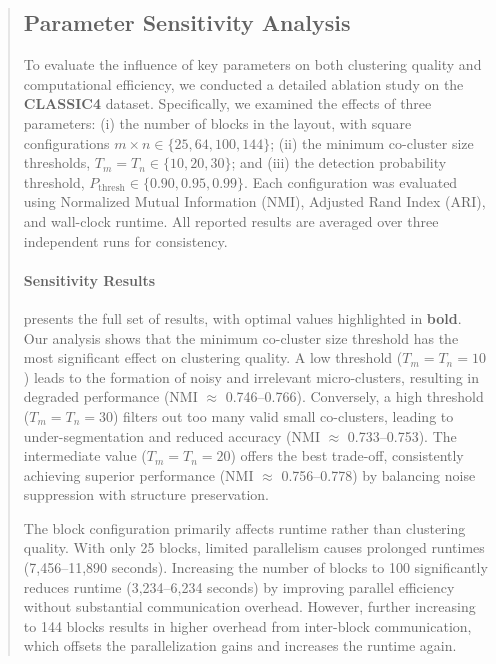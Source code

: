 \documentclass{ar2rc}
\theoremstyle{definition}
\theoremstyle{remark} %
\begin{document}
\begin{quote}
  \subsection*{ Parameter Sensitivity Analysis}

  To evaluate the influence of key parameters on both clustering quality and computational efficiency, we conducted a detailed ablation study on the \textbf{CLASSIC4} dataset. Specifically, we examined the effects of three parameters: (i) the number of blocks in the layout, with square configurations $m \times n \in \{25, 64, 100, 144\}$; (ii) the minimum co-cluster size thresholds, $T_m = T_n \in \{10, 20, 30\}$; and (iii) the detection probability threshold, $P_{\text{thresh}} \in \{0.90, 0.95, 0.99\}$. Each configuration was evaluated using Normalized Mutual Information (NMI), Adjusted Rand Index (ARI), and wall-clock runtime. All reported results are averaged over three independent runs for consistency.

  \paragraph{Sensitivity Results}
   presents the full set of results, with optimal values highlighted in \textbf{bold}. Our analysis shows that the minimum co-cluster size threshold has the most significant effect on clustering quality. A low threshold ($T_m = T_n = 10$) leads to the formation of noisy and irrelevant micro-clusters, resulting in degraded performance (NMI $\approx$ 0.746--0.766). Conversely, a high threshold ($T_m = T_n = 30$) filters out too many valid small co-clusters, leading to under-segmentation and reduced accuracy (NMI $\approx$ 0.733--0.753). The intermediate value ($T_m = T_n = 20$) offers the best trade-off, consistently achieving superior performance (NMI $\approx$ 0.756--0.778) by balancing noise suppression with structure preservation.

  The block configuration primarily affects runtime rather than clustering quality. With only 25 blocks, limited parallelism causes prolonged runtimes (7,456--11,890 seconds). Increasing the number of blocks to 100 significantly reduces runtime (3,234--6,234 seconds) by improving parallel efficiency without substantial communication overhead. However, further increasing to 144 blocks results in higher overhead from inter-block communication, which offsets the parallelization gains and increases the runtime again.


\end{quote}
\end{document}
